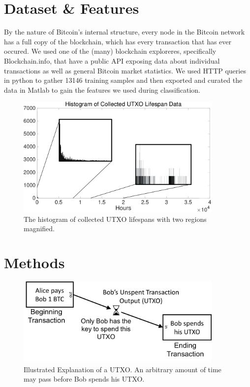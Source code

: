 \documentclass[12pt]{article}
\begin{document}
\section{Dataset \& Features}
By the nature of Bitcoin's internal structure, every node in the Bitcoin network has a full copy of the blockchain, which has every transaction that has ever occured. We used one of the (many) blockchain exploreres, specifically Blockchain.info, that have a public API exposing data about individual transactions as well as general Bitcoin market statistics. We used HTTP queries in python to gather 13146 training samples and then exported and curated the data in Matlab to gain the features we used during classification.  

\begin{figure}
\begin{center}
\includegraphics[width=0.9\textwidth]{figures/hist.png}
\end{center}
\caption{The histogram of collected UTXO lifespans with two regions magnified.}
\label{hist}
\end{figure}


\section{Methods}

\begin{figure}
\begin{center}
\includegraphics[width=0.9\textwidth]{figures/utxo}
\end{center}
\caption{Illustrated Explanation of a UTXO. An arbitrary amount of time may pass before Bob spends his UTXO.}
\label{utxo}
\end{figure}
\end{document}
